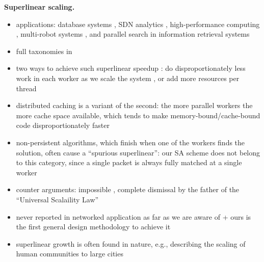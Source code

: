 \noindent%
\textbf{Superlinear scaling.} %
\begin{itemize}
\item applications: database systems \cite{scalability-analyzed, 10.5555/1012889.1012894}, SDN analytics \cite{sdn-analytitcs}, high-performance computing \cite{556383, 7733347, 6483679}, multi-robot systems \cite{10.1007/978-3-319-77610-1}, and parallel search in information retrieval systems \cite{dobb-1, dobb-2}
\item full taxonomies in \cite{7733347, 80148}
\item two ways to achieve such superlinear speedup \cite{7733347, 80148}: do disproportionately less work in each worker as we scale the system \cite{7733347}, or add more resources per thread \cite{80148}
\item distributed caching \cite{271208, dobb-2} is a variant of the second: the more parallel workers the more cache space available, which tends to make memory-bound\slash cache-bound code disproportionately faster \cite{80148}
\item non-persistent algorithms, which finish when one of the workers finds the solution, often cause a ``spurious superlinear'': our SA scheme does not belong to this category, since a single packet is always fully matched at a single worker \cite{7733347}
\item counter arguments: impossible \cite{10.1016/0167-8191(86)90024-4}, complete dismissal by the father of the ``Universal Scalaility Law'' \cite{gunther-hotsos, 10.1145/2773212.2789974}
\item never reported in networked application as far as we are aware of + ours is the first general design methodology to achieve it
\item superlinear growth is often found in nature, e.g., describing the scaling of human communities to large cities \cite{PhysRevE.79.016115}
\end{itemize}




